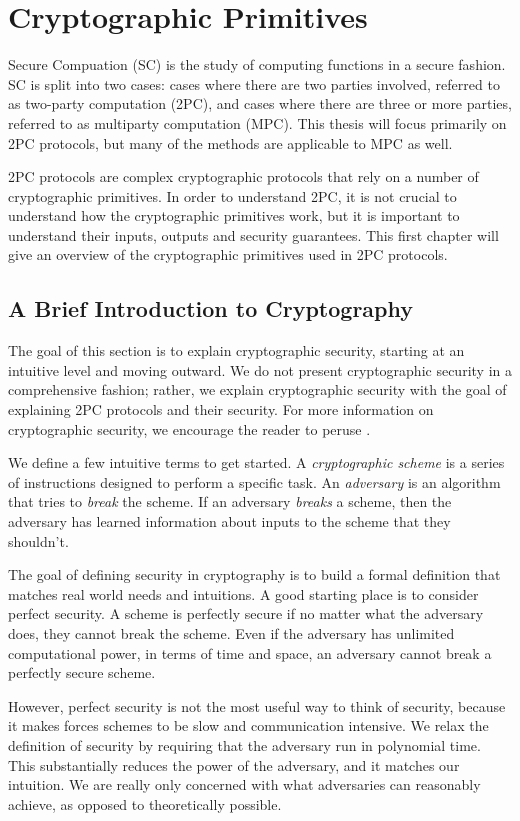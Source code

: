 \chapter{Cryptographic Primitives}
Secure Compuation (SC) is the study of computing functions in a secure fashion. 
SC is split into two cases: cases where there are two parties involved, referred to as two-party computation (2PC), and cases where there are three or more parties, referred to as multiparty computation (MPC).
This thesis will focus primarily on 2PC protocols, but many of the methods are applicable to MPC as well.

2PC protocols are complex cryptographic protocols that rely on a number of cryptographic primitives.
In order to understand 2PC, it is not crucial to understand how the cryptographic primitives work, but it is important to understand their inputs, outputs and security guarantees. 
This first chapter will give an overview of the cryptographic primitives used in 2PC protocols.

\section{A Brief Introduction to Cryptography} 
The goal of this section is to explain cryptographic security, starting at an intuitive level and moving outward. 
We do not present cryptographic security in a comprehensive fashion; rather, we explain cryptographic security with the goal of explaining 2PC protocols and their security.
For more information on cryptographic security, we encourage the reader to peruse \cite{katzlindelltextbook}. 

We define a few intuitive terms to get started.
A \textit{cryptographic scheme} is a series of instructions designed to perform a specific task. 
An \textit{adversary} is an algorithm that tries to \textit{break} the scheme. 
If an adversary \textit{breaks} a scheme, then the adversary has learned information about inputs to the scheme that they shouldn't. 

The goal of defining security in cryptography is to build a formal definition that matches real world needs and intuitions. 
A good starting place is to consider perfect security. 
A scheme is perfectly secure if no matter what the adversary does, they cannot break the scheme.
Even if the adversary has unlimited computational power, in terms of time and space, an adversary cannot break a perfectly secure scheme. 

However, perfect security is not the most useful way to think of security, because it makes forces schemes to be slow and communication intensive.
We relax the definition of security by requiring that the adversary run in polynomial time. 
This substantially reduces the power of the adversary, and it matches our intuition. 
We are really only concerned with what adversaries can reasonably achieve, as opposed to theoretically possible. 

